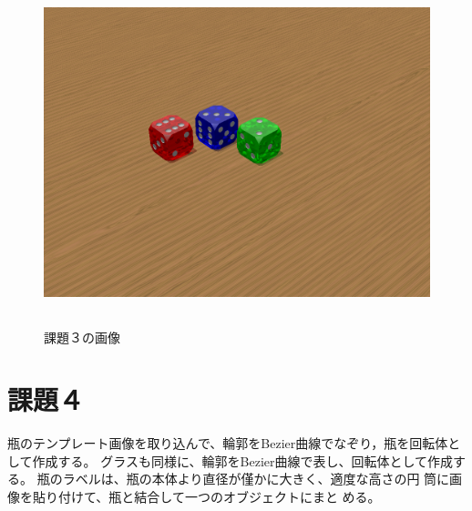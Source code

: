 \documentclass[a4j,dvipdfmx,uplatex,11pt]{jsarticle}
\begin{document}
\begin{figure}[h]
\centering
\includegraphics[height=100mm]{kadai_3.png}
\caption{課題３の画像}
\end{figure}

\clearpage

\section{課題４}
瓶のテンプレート画像を取り込んで、輪郭をBezier曲線でなぞり，瓶を回転体として作成する。
グラスも同様に、輪郭をBezier曲線で表し、回転体として作成する。
瓶のラベルは、瓶の本体より直径が僅かに大きく、適度な高さの円
筒に画像を貼り付けて、瓶と結合して一つのオブジェクトにまと
める。
\end{document}
